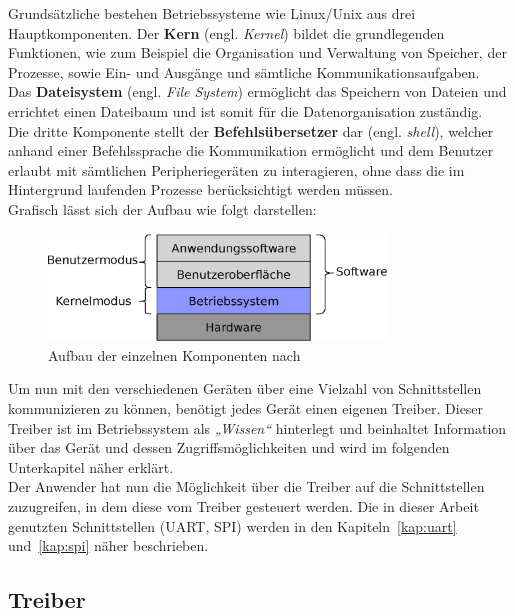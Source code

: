 Grundsätzliche bestehen Betriebssysteme wie Linux/Unix aus drei Hauptkomponenten.
Der \textbf{Kern} (engl. \emph{Kernel}) bildet die grundlegenden Funktionen, wie
zum Beispiel die Organisation und Verwaltung von Speicher, der Prozesse, sowie
Ein- und Ausgänge und sämtliche Kommunikationsaufgaben.\\
Das \textbf{Dateisystem} (engl. \emph{File System}) ermöglicht das Speichern von Dateien
und errichtet einen Dateibaum und ist somit für die Datenorganisation zuständig.\\
Die dritte Komponente stellt der \textbf{Befehlsübersetzer} dar (engl. \emph{shell}),
welcher anhand einer Befehlssprache die Kommunikation ermöglicht und dem Benutzer erlaubt
mit sämtlichen Peripheriegeräten zu interagieren, ohne dass die im Hintergrund laufenden
Prozesse berücksichtigt werden müssen. \cite{ubuntu}\\

\newpage
Grafisch lässt sich der Aufbau wie folgt darstellen:\\

\begin{figure}[h!]
\centering
\includegraphics[width=0.8\textwidth]{Hauptteil/bs.eps}
\caption{Aufbau der einzelnen Komponenten nach \cite{mbs}}
\label{fig:mbs}
\end{figure}

Um nun mit den verschiedenen Geräten über eine Vielzahl von Schnittstellen kommunizieren
zu können, benötigt jedes Gerät einen eigenen Treiber. Dieser Treiber ist im Betriebssystem
als \emph{„Wissen“} hinterlegt und beinhaltet Information über das Gerät und dessen
Zugriffsmöglichkeiten und wird im folgenden Unterkapitel näher erklärt. \cite{treiber}\\
Der Anwender hat nun die Möglichkeit über die Treiber auf die Schnittstellen zuzugreifen, in dem diese vom
Treiber gesteuert werden. Die in dieser Arbeit genutzten Schnittstellen (UART, SPI) werden in den
Kapiteln~\ref{kap:uart} und~\ref{kap:spi} näher beschrieben.

\subsection{Treiber}\label{kap:treiber}

